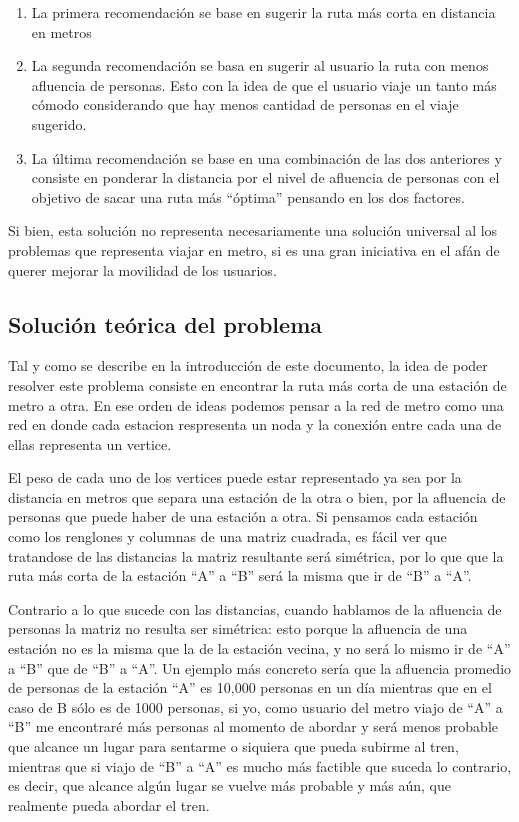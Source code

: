 \documentclass[
]{article}
\providecommand{\tightlist}{%
  \setlength{\itemsep}{0pt}\setlength{\parskip}{0pt}}
\begin{document}
\begin{enumerate}
\def\labelenumi{\arabic{enumi}.}
\tightlist
\item
  La primera recomendación se base en sugerir la ruta más corta en
  distancia en metros
\item
  La segunda recomendación se basa en sugerir al usuario la ruta con
  menos afluencia de personas. Esto con la idea de que el usuario viaje
  un tanto más cómodo considerando que hay menos cantidad de personas en
  el viaje sugerido.
\item
  La última recomendación se base en una combinación de las dos
  anteriores y consiste en ponderar la distancia por el nivel de
  afluencia de personas con el objetivo de sacar una ruta más ``óptima''
  pensando en los dos factores.
\end{enumerate}

Si bien, esta solución no representa necesariamente una solución
universal al los problemas que representa viajar en metro, si es una
gran iniciativa en el afán de querer mejorar la movilidad de los
usuarios.

\hypertarget{soluciuxf3n-teuxf3rica-del-problema}{%
\subsection{Solución teórica del
problema}\label{soluciuxf3n-teuxf3rica-del-problema}}

Tal y como se describe en la introducción de este documento, la idea de
poder resolver este problema consiste en encontrar la ruta más corta de
una estación de metro a otra. En ese orden de ideas podemos pensar a la
red de metro como una red en donde cada estacion respresenta un noda y
la conexión entre cada una de ellas representa un vertice.

El peso de cada uno de los vertices puede estar representado ya sea por
la distancia en metros que separa una estación de la otra o bien, por la
afluencia de personas que puede haber de una estación a otra. Si
pensamos cada estación como los renglones y columnas de una matriz
cuadrada, es fácil ver que tratandose de las distancias la matriz
resultante será simétrica, por lo que que la ruta más corta de la
estación ``A'' a ``B'' será la misma que ir de ``B'' a ``A''.

Contrario a lo que sucede con las distancias, cuando hablamos de la
afluencia de personas la matriz no resulta ser simétrica: esto porque la
afluencia de una estación no es la misma que la de la estación vecina, y
no será lo mismo ir de ``A'' a ``B'' que de ``B'' a ``A''. Un ejemplo
más concreto sería que la afluencia promedio de personas de la estación
``A'' es 10,000 personas en un día mientras que en el caso de B sólo es
de 1000 personas, si yo, como usuario del metro viajo de ``A'' a ``B''
me encontraré más personas al momento de abordar y será menos probable
que alcance un lugar para sentarme o siquiera que pueda subirme al tren,
mientras que si viajo de ``B'' a ``A'' es mucho más factible que suceda
lo contrario, es decir, que alcance algún lugar se vuelve más probable y
más aún, que realmente pueda abordar el tren.
\end{document}
